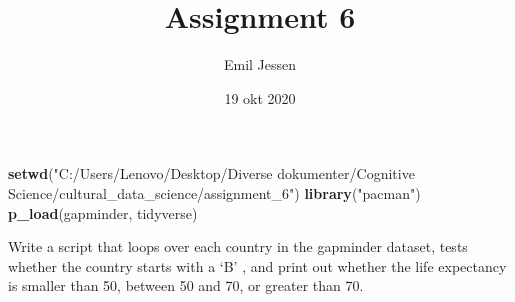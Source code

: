 \documentclass[]{article}
\title{Assignment 6}
\author{Emil Jessen}
\date{19 okt 2020}
\newenvironment{Shaded}{\begin{snugshade}}{\end{snugshade}}
\newcommand{\KeywordTok}[1]{\textcolor[rgb]{0.13,0.29,0.53}{\textbf{#1}}}
\newcommand{\StringTok}[1]{\textcolor[rgb]{0.31,0.60,0.02}{#1}}
\newcommand{\NormalTok}[1]{#1}
\begin{document}
\maketitle

\begin{Shaded}
\begin{Highlighting}[]
\KeywordTok{setwd}\NormalTok{(}\StringTok{"C:/Users/Lenovo/Desktop/Diverse dokumenter/Cognitive Science/cultural_data_science/assignment_6"}\NormalTok{)}
\KeywordTok{library}\NormalTok{(}\StringTok{"pacman"}\NormalTok{)}
\KeywordTok{p_load}\NormalTok{(gapminder, tidyverse)}
\end{Highlighting}
\end{Shaded}

Write a script that loops over each country in the gapminder dataset,
tests whether the country starts with a `B' , and print out whether the
life expectancy is smaller than 50, between 50 and 70, or greater than
70.
\end{document}
